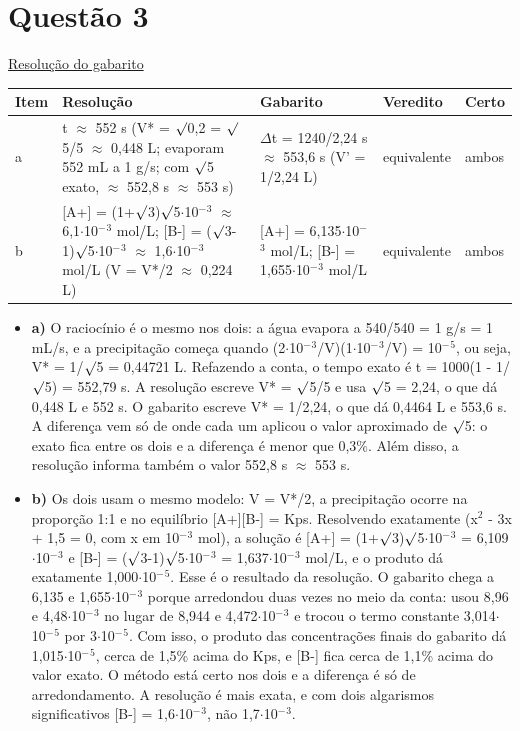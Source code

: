 \documentclass{article}%
\begin{document}
\section*{Questão 3}%
\href{https://poliedroresolve.sistemapoliedro.com.br/vestibulares/ita/2026/ita-2-fase-dia-2-29-10-2025-2-fase-dia-2/dissertativa-3-quimica-2-fase-dia-2-ita-2026}{Resolução do gabarito}\par\smallskip%
\begin{longtable}{@{}p{} p{} p{} p{} p{}@{}}\toprule Item & Resolução & Gabarito & Veredito & Certo \\ \midrule
a & t $\approx$ 552 s (V* = $\surd$0,2 = $\surd$5/5 $\approx$ 0,448 L; evaporam 552 mL a 1 g/s; com $\surd$5 exato, $\approx$ 552,8 s $\approx$ 553 s) & $\Delta$t = 1240/2,24 s $\approx$ 553,6 s (V' = 1/2,24 L) & equivalente & ambos \\
b & {[}A+{]} = (1+$\surd$3)$\surd$5$\cdot$10$^{-}$$^3$ $\approx$ 6,1$\cdot$10$^{-}$$^3$ mol/L; {[}B-{]} = ($\surd$3-1)$\surd$5$\cdot$10$^{-}$$^3$ $\approx$ 1,6$\cdot$10$^{-}$$^3$ mol/L (V = V*/2 $\approx$ 0,224 L) & {[}A+{]} = 6,135$\cdot$10$^{-}$$^3$ mol/L; {[}B-{]} = 1,655$\cdot$10$^{-}$$^3$ mol/L & equivalente & ambos \\
\bottomrule\end{longtable}%
\begin{itemize}%
\item%
\textbf{a)} O raciocínio é o mesmo nos dois: a água evapora a 540/540 = 1 g/s = 1 mL/s, e a precipitação começa quando (2$\cdot$10$^{-}$$^3$/V)(1$\cdot$10$^{-}$$^3$/V) = 10$^{-}$$^{5}$, ou seja, V* = 1/$\surd$5 = 0,44721 L. Refazendo a conta, o tempo exato é t = 1000(1 - 1/$\surd$5) = 552,79 s. A resolução escreve V* = $\surd$5/5 e usa $\surd$5 = 2,24, o que dá 0,448 L e 552 s. O gabarito escreve V* = 1/2,24, o que dá 0,4464 L e 553,6 s. A diferença vem só de onde cada um aplicou o valor aproximado de $\surd$5: o exato fica entre os dois e a diferença é menor que 0,3\%. Além disso, a resolução informa também o valor 552,8 s $\approx$ 553 s.%
\item%
\textbf{b)} Os dois usam o mesmo modelo: V = V*/2, a precipitação ocorre na proporção 1:1 e no equilíbrio {[}A+{]}{[}B-{]} = Kps. Resolvendo exatamente (x$^2$ - 3x + 1,5 = 0, com x em 10$^{-}$$^3$ mol), a solução é {[}A+{]} = (1+$\surd$3)$\surd$5$\cdot$10$^{-}$$^3$ = 6,109$\cdot$10$^{-}$$^3$ e {[}B-{]} = ($\surd$3-1)$\surd$5$\cdot$10$^{-}$$^3$ = 1,637$\cdot$10$^{-}$$^3$ mol/L, e o produto dá exatamente 1,000$\cdot$10$^{-}$$^{5}$. Esse é o resultado da resolução. O gabarito chega a 6,135 e 1,655$\cdot$10$^{-}$$^3$ porque arredondou duas vezes no meio da conta: usou 8,96 e 4,48$\cdot$10$^{-}$$^3$ no lugar de 8,944 e 4,472$\cdot$10$^{-}$$^3$ e trocou o termo constante 3,014$\cdot$10$^{-}$$^{5}$ por 3$\cdot$10$^{-}$$^{5}$. Com isso, o produto das concentrações finais do gabarito dá 1,015$\cdot$10$^{-}$$^{5}$, cerca de 1,5\% acima do Kps, e {[}B-{]} fica cerca de 1,1\% acima do valor exato. O método está certo nos dois e a diferença é só de arredondamento. A resolução é mais exata, e com dois algarismos significativos {[}B-{]} = 1,6$\cdot$10$^{-}$$^3$, não 1,7$\cdot$10$^{-}$$^3$.%
\end{itemize}%
\end{document}
